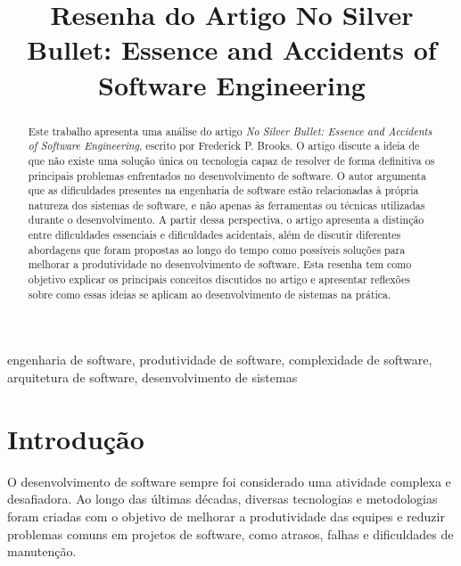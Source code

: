 \documentclass[conference]{IEEEtran}
\begin{document}
\title{Resenha do Artigo No Silver Bullet: Essence and Accidents of Software Engineering}

\author{
}

\maketitle

\begin{abstract}

Este trabalho apresenta uma análise do artigo \textit{No Silver Bullet: Essence and Accidents of Software Engineering}, escrito por Frederick P. Brooks. O artigo discute a ideia de que não existe uma solução única ou tecnologia capaz de resolver de forma definitiva os principais problemas enfrentados no desenvolvimento de software. O autor argumenta que as dificuldades presentes na engenharia de software estão relacionadas à própria natureza dos sistemas de software, e não apenas às ferramentas ou técnicas utilizadas durante o desenvolvimento. A partir dessa perspectiva, o artigo apresenta a distinção entre dificuldades essenciais e dificuldades acidentais, além de discutir diferentes abordagens que foram propostas ao longo do tempo como possíveis soluções para melhorar a produtividade no desenvolvimento de software. Esta resenha tem como objetivo explicar os principais conceitos discutidos no artigo e apresentar reflexões sobre como essas ideias se aplicam ao desenvolvimento de sistemas na prática.

\end{abstract}

\begin{IEEEkeywords}
engenharia de software, produtividade de software, complexidade de software, arquitetura de software, desenvolvimento de sistemas
\end{IEEEkeywords}

\section{Introdução}

O desenvolvimento de software sempre foi considerado uma atividade complexa e desafiadora. Ao longo das últimas décadas, diversas tecnologias e metodologias foram criadas com o objetivo de melhorar a produtividade das equipes e reduzir problemas comuns em projetos de software, como atrasos, falhas e dificuldades de manutenção.
\end{document}
